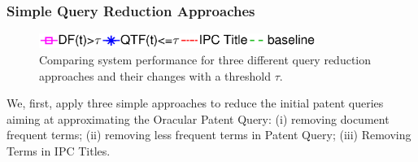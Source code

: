 \subsubsection{Simple Query Reduction Approaches}
\begin{figure}[t!]
\begin{centering}
\includegraphics[width=9cm]{figs/l3}
\par\end{centering}

\begin{centering}
 \hspace*{1.5cm}  
\par\end{centering} 

\protect\caption{Comparing system performance for three different query reduction approaches and their changes with a threshold $\tau$.}
\label{fig:combinedapproach}
\end{figure}
\label{SimpleApproaches}
We, first, apply three simple approaches to reduce the initial patent queries aiming at approximating the Oracular Patent Query: (i) removing document frequent terms; (ii) removing less frequent terms in Patent Query; (iii) Removing Terms in IPC Titles.
